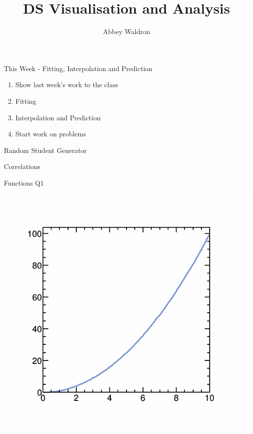 \documentclass{beamer}
\newif\ifplacelogo
\begin{document}
\setlength{\unitlength}{1mm}
\title{DS Visualisation and Analysis}
\author[Abbey Waldron]{Abbey Waldron}
\date[September 25th, 2015]{}





{
\placelogofalse
\begin{frame}
  \titlepage
\end{frame}
}



\begin{frame}{This Week - Fitting, Interpolation and Prediction}

\begin{enumerate}
\item Show last week's work to the class
\item Fitting
\item Interpolation and Prediction
\item Start work on problems
\end{enumerate}

\end{frame}



\begin{frame}{Random Student Generator}

\end{frame}



\begin{frame}{Correlations}

\end{frame}


\begin{frame}{Functions Q1}
\begin{center}
\includegraphics[scale=0.3]{pics/wk3/q1.png}
\end{center}
\end{frame}
\end{document}
